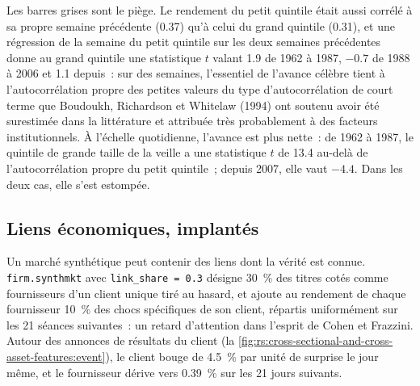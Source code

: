 Les barres grises sont le piège. Le rendement du petit quintile était aussi corrélé à sa propre semaine précédente (0.37) qu'à celui du grand
quintile (0.31), et une régression de la semaine du petit quintile sur les deux semaines précédentes donne au grand quintile une statistique $t$
valant 1.9 de 1962 à 1987, $-0.7$ de 1988 à 2006 et 1.1 depuis~: sur des semaines, l'essentiel de l'avance célèbre tient à l'autocorrélation propre des petites valeurs
du type d'autocorrélation de court terme que Boudoukh, Richardson et Whitelaw (1994) ont soutenu avoir été surestimée
dans la littérature et attribuée très probablement à des facteurs institutionnels. À l'échelle quotidienne, l'avance est plus nette~: de 1962 à 1987, le quintile de grande taille de la veille
a une statistique $t$ de 13.4 au-delà de l'autocorrélation propre du petit quintile~; depuis 2007, elle vaut $-4.4$. Dans les deux cas, elle s'est estompée.

\subsection{Liens économiques, implantés}

Un marché synthétique peut contenir des liens dont la vérité est connue. \texttt{firm.synthmkt} avec \texttt{link\_share = 0.3} désigne 30~\% des titres cotés comme fournisseurs
d'un client unique tiré au hasard, et ajoute au rendement de chaque fournisseur 10~\% des chocs spécifiques de son client,
répartis uniformément sur les 21 séances suivantes~: un retard d'attention dans l'esprit de Cohen et Frazzini. Autour des annonces
de résultats du client (la \cref{fig:rs:cross-sectional-and-cross-asset-features:event}), le client bouge de 4.5~\% par unité de surprise le
jour même, et le fournisseur dérive vers 0.39~\% sur les 21 jours suivants.

